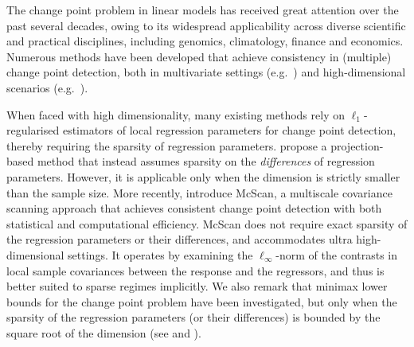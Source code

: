 \documentclass[11pt, a4paper]{article}
\theoremstyle{definition}
\theoremstyle{definition}
\theoremstyle{definition}
\theoremstyle{definition}
\theoremstyle{definition}
\theoremstyle{remark}
\theoremstyle{definition}
\theoremstyle{definition}
\theoremstyle{definition}
\begin{document}
The change point problem in linear models has received great attention over the past several decades, owing to its widespread applicability across diverse scientific and practical disciplines, including genomics, climatology, finance and economics. Numerous methods have been developed that achieve consistency in (multiple) change point detection, both in multivariate settings (e.g.\ \citealp{csorgo1997limit, bai1998estimating}) and high-dimensional scenarios (e.g.\ \citealp{lee2016lasso, kaul2019detection, wang2021statistically, rinaldo2020localizing, cho2022high, xu2024change}). 

When faced with high dimensionality, many existing methods %
rely on $\ell_1$-regularised estimators of local regression parameters for change point detection, thereby requiring the sparsity of regression parameters. 
\cite{gao2022sparse} propose a projection-based method that instead assumes sparsity on the \emph{differences} of regression parameters. However, it is applicable only when the dimension is strictly smaller than the sample size. 
More recently, \cite{cho2024detection} introduce McScan, a multiscale covariance scanning approach that achieves consistent change point detection with both statistical and computational efficiency. McScan does not require exact sparsity of the regression parameters or their differences, and accommodates ultra high-dimensional settings. It operates by examining the $\ell_\infty$-norm of the contrasts in local sample covariances between the response and the regressors, and thus is better suited to sparse regimes implicitly. 
We also remark that minimax lower bounds for the change point problem have been investigated, but only when the sparsity of the regression parameters (or their differences) is bounded by the square root of the dimension (see \citealp{rinaldo2020localizing} and \citealp{cho2024detection}). 
\end{document}
